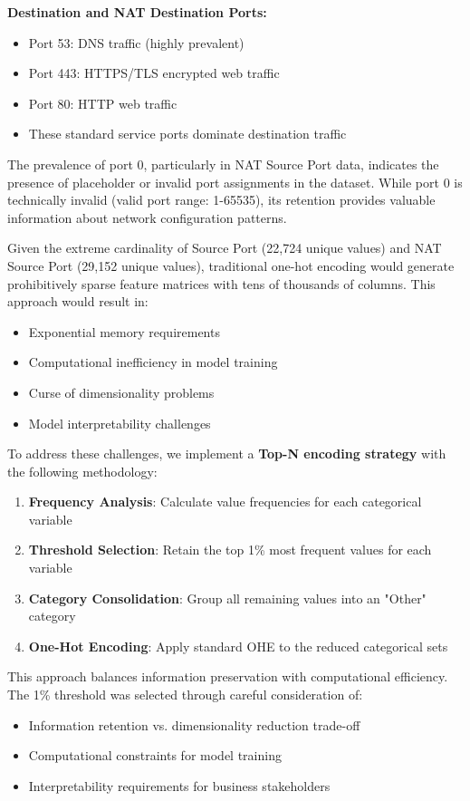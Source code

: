 \documentclass[12pt,a4paper]{article}
\begin{document}
\textbf{Destination and NAT Destination Ports:}
\begin{itemize}
    \item Port 53: DNS traffic (highly prevalent)
    \item Port 443: HTTPS/TLS encrypted web traffic
    \item Port 80: HTTP web traffic
    \item These standard service ports dominate destination traffic
\end{itemize}

The prevalence of port 0, particularly in NAT Source Port data, indicates the presence of placeholder or invalid port assignments in the dataset. While port 0 is technically invalid (valid port range: 1-65535), its retention provides valuable information about network configuration patterns.

Given the extreme cardinality of Source Port (22,724 unique values) and NAT Source Port (29,152 unique values), traditional one-hot encoding would generate prohibitively sparse feature matrices with tens of thousands of columns. This approach would result in:

\begin{itemize}
    \item Exponential memory requirements
    \item Computational inefficiency in model training
    \item Curse of dimensionality problems
    \item Model interpretability challenges
\end{itemize}

To address these challenges, we implement a \textbf{Top-N encoding strategy} with the following methodology:

\begin{enumerate}
    \item \textbf{Frequency Analysis}: Calculate value frequencies for each categorical variable
    \item \textbf{Threshold Selection}: Retain the top 1\% most frequent values for each variable
    \item \textbf{Category Consolidation}: Group all remaining values into an "Other" category
    \item \textbf{One-Hot Encoding}: Apply standard OHE to the reduced categorical sets
\end{enumerate}

This approach balances information preservation with computational efficiency. The 1\% threshold was selected through careful consideration of:
\begin{itemize}
    \item Information retention vs. dimensionality reduction trade-off
    \item Computational constraints for model training
    \item Interpretability requirements for business stakeholders
\end{itemize}
\end{document}
